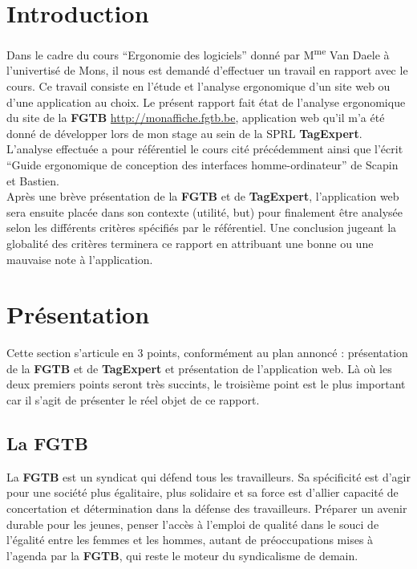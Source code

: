 \documentclass{article}
\begin{document}
\begin{sffamily}



\tableofcontents

\newpage

\section{Introduction}

Dans le cadre du cours ``Ergonomie des logiciels'' donné par M\textsuperscript{me} Van Daele à l'univertisé de Mons, il nous est demandé 
d'effectuer un travail en rapport avec le cours. Ce travail consiste en l'étude et l'analyse ergonomique d'un site web ou d'une application au 
choix. Le présent rapport fait état de l'analyse ergonomique du site de la \textbf{FGTB} \url{http://monaffiche.fgtb.be}, application web qu'il m'a 
été donné de développer lors de mon stage au sein de la SPRL \textbf{TagExpert}. L'analyse effectuée a pour référentiel le cours cité 
précédemment ainsi que l'écrit ``Guide ergonomique de conception des interfaces homme-ordinateur'' de Scapin et Bastien.\\

Après une brève présentation de la \textbf{FGTB} et de \textbf{TagExpert}, l'application web sera ensuite placée dans son contexte (utilité, but) 
pour finalement être analysée selon les différents critères spécifiés par le référentiel. Une conclusion jugeant la globalité des critères 
terminera ce rapport en attribuant une bonne ou une mauvaise note à l'application. 

\section{Présentation}

Cette section s'articule en 3 points, conformément au plan annoncé : présentation de la \textbf{FGTB} et de \textbf{TagExpert} et présentation de 
l'application web. Là où les deux premiers points seront très succints, le troisième point est le plus important car il s'agit de présenter le réel 
objet de ce rapport.

\subsection{La FGTB}

La \textbf{FGTB} est un syndicat qui défend tous les travailleurs. Sa spécificité est d'agir pour une société plus égalitaire, plus solidaire et sa 
force est d'allier capacité de concertation et détermination dans la défense des travailleurs. Préparer un avenir durable pour les jeunes, penser 
l’accès à l’emploi de qualité dans le souci de l’égalité entre les femmes et les hommes, autant de préoccupations mises à l’agenda par la 
\textbf{FGTB}, qui reste le moteur du syndicalisme de demain. \\


\end{sffamily}
\end{document}
